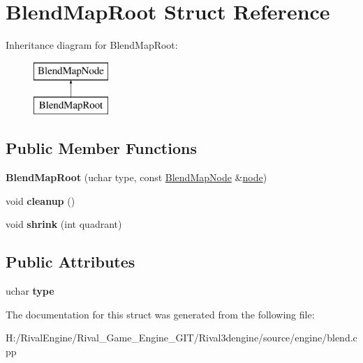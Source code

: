 \hypertarget{struct_blend_map_root}{}\section{Blend\+Map\+Root Struct Reference}
\label{struct_blend_map_root}
Inheritance diagram for Blend\+Map\+Root\+:\begin{figure}[H]
\begin{center}
\leavevmode
\includegraphics[height=2.000000cm]{struct_blend_map_root}
\end{center}
\end{figure}
\subsection*{Public Member Functions}
\begin{DoxyCompactItemize}
\item 
\mbox{\label{struct_blend_map_root_a34d41ce7a40167aa0a843117409360c5}} 
{\bfseries Blend\+Map\+Root} (uchar type, const \hyperlink{struct_blend_map_node}{Blend\+Map\+Node} \&\hyperlink{structnode}{node})
\item 
\mbox{\label{struct_blend_map_root_a69fa8e8de5442dd66b46bf8617c32e75}} 
void {\bfseries cleanup} ()
\item 
\mbox{\label{struct_blend_map_root_a9be01279e5d8befb9016f43e6dfa76f8}} 
void {\bfseries shrink} (int quadrant)
\end{DoxyCompactItemize}
\subsection*{Public Attributes}
\begin{DoxyCompactItemize}
\item 
\mbox{\label{struct_blend_map_root_acaeed8fc93bd2f2f88e95572b3d6386a}} 
uchar {\bfseries type}
\end{DoxyCompactItemize}


The documentation for this struct was generated from the following file\+:\begin{DoxyCompactItemize}
\item 
H\+:/\+Rival\+Engine/\+Rival\+\_\+\+Game\+\_\+\+Engine\+\_\+\+G\+I\+T/\+Rival3dengine/source/engine/blend.\+cpp\end{DoxyCompactItemize}
